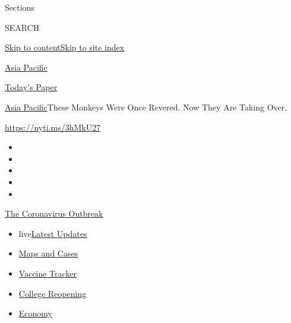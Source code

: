 Sections

SEARCH

\protect\hyperlink{site-content}{Skip to
content}\protect\hyperlink{site-index}{Skip to site index}

\href{https://www.nytimes.com/section/world/asia}{Asia Pacific}

\href{https://myaccount.nytimes.com/auth/login?response_type=cookie\&client_id=vi}{}

\href{https://www.nytimes.com/section/todayspaper}{Today's Paper}

\href{/section/world/asia}{Asia Pacific}\textbar{}These Monkeys Were
Once Revered. Now They Are Taking Over.

\url{https://nyti.ms/3hMkU27}

\begin{itemize}
\item
\item
\item
\item
\item
\end{itemize}

\href{https://www.nytimes.com/news-event/coronavirus?action=click\&pgtype=Article\&state=default\&region=TOP_BANNER\&context=storylines_menu}{The
Coronavirus Outbreak}

\begin{itemize}
\tightlist
\item
  live\href{https://www.nytimes.com/2020/08/03/world/coronavirus-covid-19.html?action=click\&pgtype=Article\&state=default\&region=TOP_BANNER\&context=storylines_menu}{Latest
  Updates}
\item
  \href{https://www.nytimes.com/interactive/2020/us/coronavirus-us-cases.html?action=click\&pgtype=Article\&state=default\&region=TOP_BANNER\&context=storylines_menu}{Maps
  and Cases}
\item
  \href{https://www.nytimes.com/interactive/2020/science/coronavirus-vaccine-tracker.html?action=click\&pgtype=Article\&state=default\&region=TOP_BANNER\&context=storylines_menu}{Vaccine
  Tracker}
\item
  \href{https://www.nytimes.com/2020/08/02/us/covid-college-reopening.html?action=click\&pgtype=Article\&state=default\&region=TOP_BANNER\&context=storylines_menu}{College
  Reopening}
\item
  \href{https://www.nytimes.com/live/2020/08/03/business/stock-market-today-coronavirus?action=click\&pgtype=Article\&state=default\&region=TOP_BANNER\&context=storylines_menu}{Economy}
\end{itemize}

